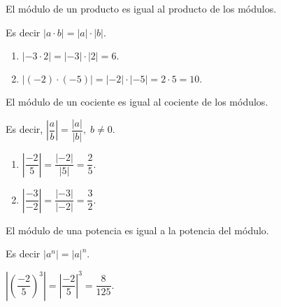\begin{propiedad}{}

El módulo de un producto es igual al producto de los módulos. 

\end{propiedad}

Es decir $\left|a\cdot b\right|=\left|a\right|\cdot\left|b\right|.$

\begin{ejemplos}
\begin{enumerate}
\item $\left|-3\cdot2\right|=\left|-3\right|\cdot\left|2\right|=6.$
\item $\left|\left(-2\right)\cdot\left(-5\right)\right|=\left|-2\right|\cdot\left|-5\right|=2\cdot5=10.$
\end{enumerate}
\end{ejemplos}

\begin{propiedad}{}

El módulo de un cociente es igual al cociente de los módulos.

\end{propiedad}

Es decir, $\left|\dfrac{a}{b}\right|=\dfrac{\left|a\right|}{\left|b\right|},\;b\neq0.$ 

\begin{ejemplos}
\begin{enumerate}
\item $\left|\dfrac{-2}{5}\right|=\dfrac{\left|-2\right|}{\left|5\right|}=\dfrac{2}{5}.$
\item $\left|\dfrac{-3}{-2}\right|=\dfrac{\left|-3\right|}{\left|-2\right|}=\dfrac{3}{2}.$
\end{enumerate}
\end{ejemplos}

\begin{propiedad}{}

El módulo de una potencia es igual a la potencia del módulo. 

\end{propiedad}

Es decir $\left|a^{n}\right|=\left|a\right|^{n}.$

\begin{ejemplo}

$\left|\left(\dfrac{-2}{5}\right)^{3}\right|=\left|\dfrac{-2}{5}\right|^{3}=\dfrac{8}{125}.$

\end{ejemplo}

